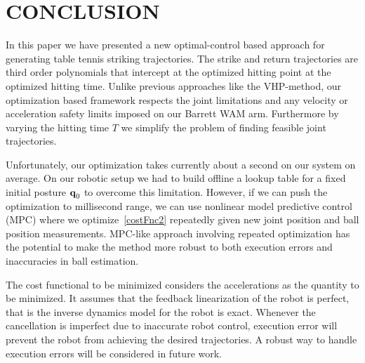 \section{CONCLUSION}\label{end}

In this paper we have presented a new optimal-control based approach for generating table tennis striking trajectories. The strike and return trajectories are third order polynomials that intercept at the optimized hitting point at the optimized hitting time. Unlike previous approaches like the VHP-method, our optimization based framework respects the joint limitations and any velocity or acceleration safety limits imposed on our Barrett WAM arm. Furthermore by varying the hitting time $T$ we simplify the problem of finding feasible joint trajectories. 

Unfortunately, our optimization takes currently about a second on our system on average. On our robotic setup we had to build offline a lookup table for a fixed initial posture $\boldsymbol{\mathrm{q}}_0$ to overcome this limitation. However, if we can push the optimization to millisecond range, we can use nonlinear model predictive control (MPC) where we optimize~\eqref{costFnc2} repeatedly given new joint position and ball position measurements. MPC-like approach involving repeated optimization has the potential to make the method more robust to both execution errors and inaccuracies in ball estimation. 

The cost functional to be minimized considers the accelerations as the quantity to be minimized. It assumes that the feedback linearization of the robot is perfect, that is the inverse dynamics model for the robot is exact. Whenever the cancellation is imperfect due to inaccurate robot control, execution error will prevent the robot from achieving the desired trajectories. A robust way to handle execution errors will be considered in future work.